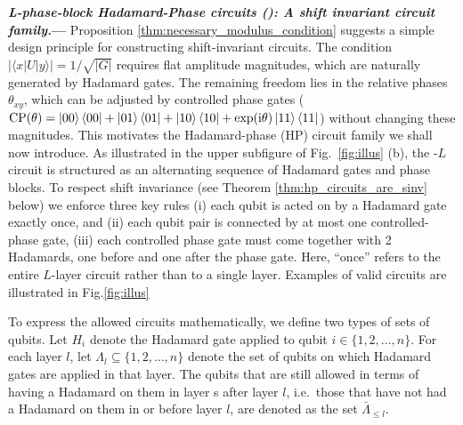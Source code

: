 \documentclass[reprint, aps, prl, superscriptaddress]{revtex4-2}
\renewcommand{\section}[1]{\par\medskip\noindent\textbf{{\textit{#1.}---}}}
\newcommand{\ii}{\mathrm{i}}
\newcommand{\myqc}{\text{HP}}
\begin{document}
\section{L-phase-block Hadamard-Phase circuits (\myqc): A shift invariant circuit family}
Proposition \ref{thm:necessary_modulus_condition} suggests a simple design principle for constructing shift-invariant circuits. The condition \(|\langle x|U|y\rangle|=1/\sqrt{|G|}\) requires flat amplitude magnitudes, which are naturally generated by Hadamard gates. The remaining freedom lies in the relative phases \(\theta_{xy}\), which can be adjusted by controlled phase gates ($\mathrm{CP}(\theta)=\ket{00}\bra{00}+\ket{01}\bra{01}+\ket{10}\bra{10}+\exp(\ii\theta)\ket{11}\bra{11}$) without changing these magnitudes. This motivates the Hadamard-phase (HP) circuit family we shall now introduce. As illustrated in the upper subfigure of Fig.~\ref{fig:illus} (b), the \myqc-$L$ circuit is structured as an alternating sequence of Hadamard gates and phase blocks. To respect shift invariance (see Theorem \ref{thm:hp_circuits_are_sinv} below) we enforce three key rules (i) each qubit is acted on by a Hadamard gate exactly once, and (ii) each qubit pair is connected by at most one controlled-phase gate, (iii) each controlled phase gate must come together with 2 Hadamards, one before and one after the phase gate. Here, ``once'' refers to the entire $L$-layer circuit rather than to a single layer. Examples of valid circuits are illustrated in Fig.\ref{fig:illus}





To express the allowed circuits mathematically, we define two types of sets of qubits.
Let \(H_i\) denote the Hadamard gate applied to qubit
\(i\in\{1,2,\ldots,n\}\). For each layer \(l\), let
\(\Lambda_l\subseteq\{1,2,\ldots,n\}\) denote the set of qubits on which
Hadamard gates are applied in that layer. The qubits that are still allowed in terms of having a Hadamard on them in layer s after layer $l$, i.e.\ those that have not had a Hadamard on them in or before layer $l$, are denoted as the set \(\bar{\Lambda}_{\leq l}\).
\end{document}
